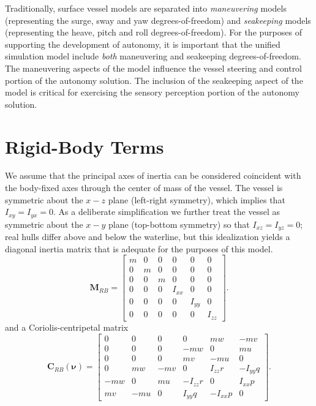 \documentclass[11pt,letterpaper]{article}
\begin{document}
Traditionally, surface vessel models are separated into \emph{maneuvering} models (representing the surge, sway and yaw degrees-of-freedom) and \emph{seakeeping} models (representing the heave, pitch and roll degrees-of-freedom). For the purposes of supporting the development of autonomy, it is important that the unified simulation model include \emph{both} maneuvering and seakeeping degrees-of-freedom. The maneuvering aspects of the model influence the vessel steering and control portion of the autonomy solution. The inclusion of the seakeeping aspect of the model is critical for exercising the sensory perception portion of the autonomy solution.

\section{Rigid-Body Terms}

We assume that the principal axes of inertia can be considered coincident with the body-fixed axes through the center of mass of the vessel.  The vessel is symmetric about the $x-z$ plane (left-right symmetry), which implies that $I_{xy}=I_{yx}=0$.  As a deliberate simplification we further treat the vessel as symmetric about the $x-y$ plane (top-bottom symmetry) so that $I_{xz}=I_{yz}=0$; real hulls differ above and below the waterline, but this idealization yields a diagonal inertia matrix that is adequate for the purposes of this model.
\begin{equation}
\bm{M}_{RB}= \left[
\begin{array}{ccccccc}
m & 0 & 0 & 0 & 0 & 0 \\
0 & m & 0 & 0 & 0 & 0 \\
0 & 0 & m & 0 & 0 & 0 \\
0 & 0 & 0 & I_{xx} & 0 & 0 \\
0 & 0 & 0 & 0 & I_{yy} & 0 \\
0 & 0 & 0 & 0 & 0 & I_{zz}
\end{array} \right].
\end{equation}
and a Coriolis-centripetal matrix
\begin{equation}
\bm{C}_{RB}(\bm{\nu})= \left[
\begin{array}{ccccccc}
  0 & 0 & 0 & 0 & mw & -mv \\
  0 & 0 & 0 & -mw & 0 & mu \\
  0 & 0 & 0 & mv & -mu & 0 \\
  0 & mw  & -mv & 0 & I_{zz}r & -I_{yy}q \\
  -mw & 0 & mu & -I_{zz}r & 0 & I_{xx}p \\
  mv & -mu & 0 & I_{yy}q & -I_{xx}p  & 0
\end{array} \right].
\end{equation}
\end{document}
